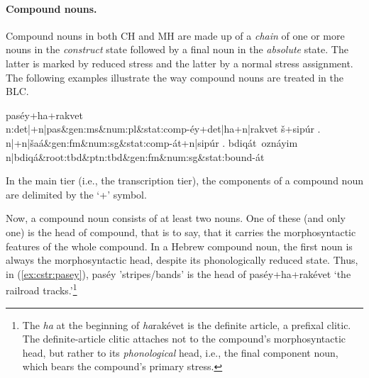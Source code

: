\paragraph{Compound nouns.}
Compound nouns in both \ac{CH} and \ac{MH} are made up of a \emph{chain} of 
one or more nouns in the \emph{construct} state followed by a final noun
in the \emph{absolute} state. The latter is marked by reduced stress 
and the latter by a normal stress assignment. The following examples 
illustrate the way compound nouns are treated in the \ac{BLC}.
\begin{exe}
\ex \label{ex:cstr:pasey}
	\textsf{pas\'{e}y+ha+rakvet} \\
	\textsf{n:det|+n|pas\&gen:ms\&num:pl\&stat:comp-\'{e}y+det|ha+n|rakvet}
\ex \label{ex:cstr:shaat} 
	\textsf{\v{s}+sip\'{u}r .} \\
	\textsf{n|+n|\v{s}a\'a\&gen:fm\&num:sg\&stat:comp-\'at+n|sip\'ur .}
\ex \label{ex:cstr:bdiqat} 
	\textsf{bdiq\'{a}t\, ozn\'{a}yim} \\ 
	\textsf{n|bdiq\'{a}\&root:tbd\&ptn:tbd\&gen:fm\&num:sg\&stat:bound-\'{a}t}
\end{exe}
In the main tier (i.e., the transcription tier), the components of a compound noun are
delimited by the `+' symbol. 

Now, a compound noun consists of at least two nouns. One of these 
(and only one) is the head of compound, that is to say, that it carries the morphosyntactic 
features of the whole compound.
In a Hebrew compound noun, the first noun
is always the morphosyntactic head, despite its phonologically reduced state.
Thus, in (\ref{ex:cstr:pasey}), \textsf{pas\'{e}y} 'stripes/bands' is the head of 
\textsf{pas\'{e}y+ha+rak\'{e}vet} `the railroad tracks.'\footnote{The \textit{ha} at the beginning of  
\textsf{\textit{ha}rak\'{e}vet} 
is the definite article, a prefixal clitic. The definite-article clitic attaches not 
to the compound's morphosyntactic head, but rather to its \emph{phonological} 
head, i.e., the final component noun, which bears the compound's primary stress.}

